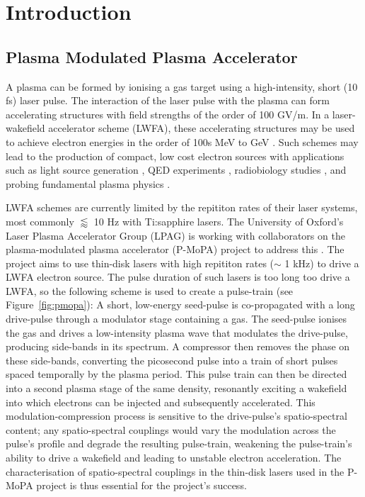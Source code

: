 \chapter{Introduction}
\label{chap:introduction}

\section{{Plasma Modulated Plasma Accelerator}}
\label{sec:intro-motivation}
A plasma can be formed by ionising a gas target using a high-intensity, short (10 fs) laser pulse. 
The interaction of the laser pulse with the plasma can form accelerating structures with field 
strengths of the order of 100 GV/m. In a laser-wakefield accelerator scheme (LWFA), these accelerating structures may be used 
to achieve electron energies in the order of 100s MeV to GeV \cite{esarey2009}. Such schemes may lead to the production of compact, low cost
electron sources with applications such as light source generation \cite{geddes2017}, QED experiments \cite{los2025}, radiobiology studies
 \cite{mcanespie2024}, and probing fundamental plasma 
physics \cite{balcazar2025}.

LWFA schemes are currently limited by the repititon rates of their laser systems, most commonly $\lessapprox$ 10 Hz with Ti:sapphire lasers. 
The University of Oxford's Laser Plasma Accelerator Group (LPAG) is working with collaborators on the plasma-modulated plasma accelerator (P-MoPA)
project to address this \cite{jakobsson2021,alejo2022,vandewetering2023,vandewetering2024,ross2024}. The project aims to use thin-disk lasers
with high repititon rates ($\sim$ 1 kHz) to drive a LWFA electron source. The pulse duration of such lasers is too long too drive a LWFA, so
the following scheme is used to create a pulse-train (see Figure~\ref{fig:pmopa}): A short, low-energy seed-pulse is co-propagated with a long drive-pulse through
a modulator stage containing a gas. The seed-pulse ionises the gas and drives a low-intensity plasma wave that modulates the drive-pulse,
producing side-bands in its spectrum. A compressor then removes the phase on these side-bands, converting the picosecond pulse into a train
of short pulses spaced temporally by the plasma period. This pulse train can then be directed into a second plasma stage of the same density,
resonantly exciting a wakefield into which electrons can be injected and subsequently accelerated. This modulation-compression process is
sensitive to the drive-pulse's spatio-spectral content; any spatio-spectral couplings would vary the modulation across the pulse's profile and
degrade the resulting pulse-train, weakening the pulse-train's ability to drive a wakefield and leading to unstable electron acceleration.
The characterisation of spatio-spectral couplings in the thin-disk lasers used in the P-MoPA project is thus essential for the project's success.

